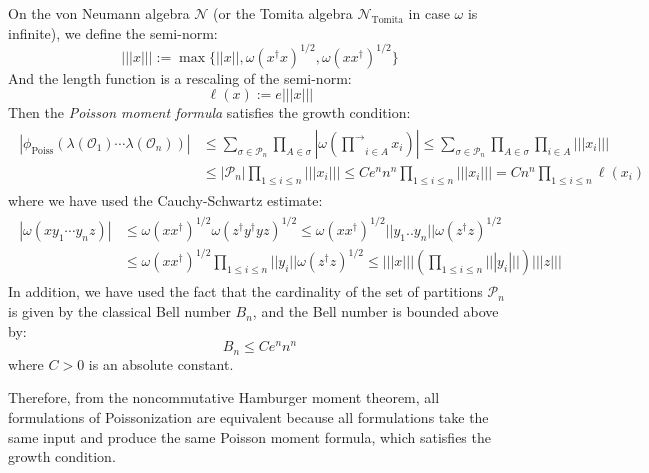 \documentclass[a4paper,11pt]{article}
\theoremstyle{definition}
\numberwithin{equation}{section}
\begin{document}
On the von Neumann algebra $\mathcal{N}$ (or the Tomita algebra $\mathcal{N}_\text{Tomita}$ in case $\omega$ is infinite), we define the semi-norm:
\begin{equation}
    |||x||| := \max\{||x||, \omega(x^\dagger x)^{1/2}, \omega(xx^\dagger)^{1/2}\}
\end{equation}
And the length function is a rescaling of the semi-norm:
\begin{equation}
    \ell(x):=e|||x|||
\end{equation}
Then the \textit{Poisson moment formula} satisfies the growth condition:
\begin{align}
    \begin{split}
        |\phi_\text{Poiss}(\lambda(\mathcal{O}_1)\cdots\lambda(\mathcal{O}_n))| &\leq \sum_{\sigma\in\mathcal{P}_n}\prod_{A\in\sigma}|\omega(\overrightarrow{\prod}_{i\in A}x_i)| \leq \sum_{\sigma\in\mathcal{P}_n}\prod_{A\in\sigma}\prod_{i\in A}|||x_i|||
        \\
        &\leq |\mathcal{P}_n| \prod_{1\leq i\leq n}|||x_i||| \leq Ce^nn^n\prod_{1\leq i\leq n}|||x_i||| = Cn^n\prod_{1\leq i\leq n}\ell(x_i)
    \end{split}
\end{align}
where we have used the Cauchy-Schwartz estimate:
\begin{align}
    \begin{split}
        |\omega(xy_1\cdots y_nz)| &\leq \omega(xx^\dagger)^{1/2}\omega(z^\dagger y^\dagger y z)^{1/2}\leq \omega(xx^\dagger)^{1/2}||y_1..y_n||\omega(z^\dagger z)^{1/2} \\
        &\leq \omega(xx^\dagger)^{1/2}\prod_{1\leq i\leq n}||y_i||\omega(z^\dagger z)^{1/2}
        \leq |||x|||(\prod_{1\leq i\leq n}|||y_i|||)|||z|||
    \end{split}
\end{align}
In addition, we have used the fact that the cardinality of the set of partitions $\mathcal{P}_n$ is given by the classical Bell number $B_n$, and the Bell number is bounded above by:
\begin{equation}
    B_n\leq Ce^nn^n
\end{equation}
where $C>0$ is an absolute constant.

Therefore, from the noncommutative Hamburger moment theorem, all formulations of Poissonization are equivalent because all formulations take the same input and produce the same Poisson moment formula, which satisfies the growth condition.
\end{document}
